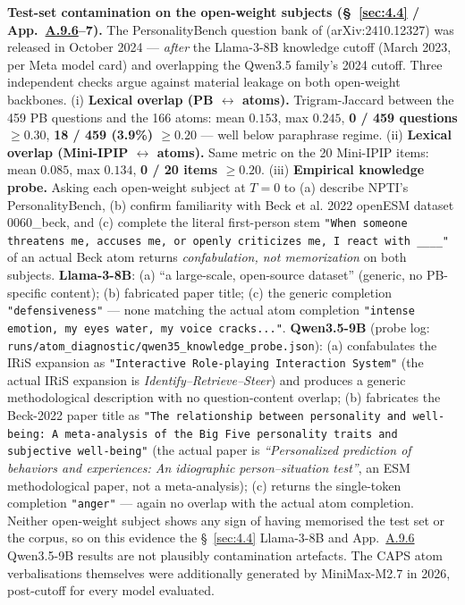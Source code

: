 \textbf{Test-set contamination on the open-weight subjects (\S~\ref{sec:4.4} / App.~\hyperref[app:A.9.6]{A.9.6}--7).} The PersonalityBench question bank of \citet{NPTI} (arXiv:2410.12327) was released in October 2024 --- \textit{after} the Llama-3-8B knowledge cutoff (March 2023, per Meta model card) and overlapping the Qwen3.5 family's 2024 cutoff. Three independent checks argue against material leakage on both open-weight backbones. (i) \textbf{Lexical overlap (PB $\leftrightarrow$ atoms).} Trigram-Jaccard between the 459 PB questions and the 166 atoms: mean $0.153$, max $0.245$, \textbf{0 / 459 questions $\geq 0.30$}, \textbf{18 / 459 (3.9\%) $\geq 0.20$} --- well below paraphrase regime. (ii) \textbf{Lexical overlap (Mini-IPIP $\leftrightarrow$ atoms).} Same metric on the 20 Mini-IPIP items: mean $0.085$, max $0.134$, \textbf{0 / 20 items $\geq 0.20$}. (iii) \textbf{Empirical knowledge probe.} Asking each open-weight subject at $T{=}0$ to (a) describe NPTI's PersonalityBench, (b) confirm familiarity with Beck et al. 2022 openESM dataset 0060\_beck, and (c) complete the literal first-person stem \texttt{"When someone threatens me,\allowbreak{} accuses me,\allowbreak{} or openly criticizes me,\allowbreak{} I react with \_\allowbreak{}\_\allowbreak{}\_\allowbreak{}\_\allowbreak{}"} of an actual Beck atom returns \textit{confabulation, not memorization} on both subjects. \textbf{Llama-3-8B}: (a) ``a large-scale, open-source dataset'' (generic, no PB-specific content); (b) fabricated paper title; (c) the generic completion \texttt{"defensiveness"} --- none matching the actual atom completion \texttt{"intense emotion,\allowbreak{} my eyes water,\allowbreak{} my voice cracks..."}. \textbf{Qwen3.5-9B} (probe log: \texttt{runs/\allowbreak{}atom\_\allowbreak{}diagnostic/\allowbreak{}qwen35\_\allowbreak{}knowledge\_\allowbreak{}probe.json}): (a) confabulates the IRiS expansion as \texttt{"Interactive Role-\allowbreak{}playing Interaction System"} (the actual IRiS expansion is \textit{Identify--Retrieve--Steer}) and produces a generic methodological description with no question-content overlap; (b) fabricates the Beck-2022 paper title as \texttt{"The relationship between personality and well-\allowbreak{}being: A meta-\allowbreak{}analysis of the Big Five personality traits and subjective well-\allowbreak{}being"} (the actual paper is \textit{``Personalized prediction of behaviors and experiences: An idiographic person--situation test''}, an ESM methodological paper, not a meta-analysis); (c) returns the single-token completion \texttt{"anger"} --- again no overlap with the actual atom completion. Neither open-weight subject shows any sign of having memorised the test set or the corpus, so on this evidence the \S~\ref{sec:4.4} Llama-3-8B and App.~\hyperref[app:A.9.6]{A.9.6} Qwen3.5-9B results are not plausibly contamination artefacts. The CAPS atom verbalisations themselves were additionally generated by MiniMax-M2.7 in 2026, post-cutoff for every model evaluated.

